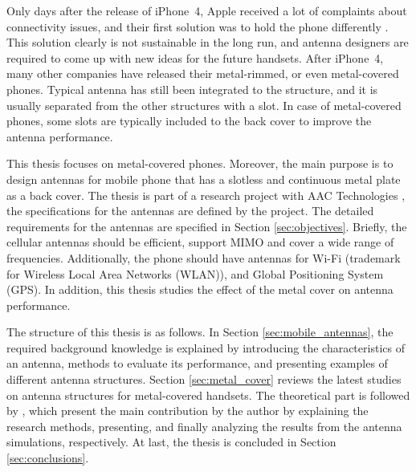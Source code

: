 Only days after the release of iPhone~4, Apple received a lot of complaints about connectivity issues, and their first solution was to hold the phone differently \cite{apple_press,apple_bbc}. This solution clearly is not sustainable in the long run, and antenna designers are required to come up with new ideas for the future handsets. After iPhone~4, many other companies have released their metal-rimmed, or even metal-covered phones. Typical antenna has still been integrated to the structure, and it is usually separated from the other structures with a slot. In case of metal-covered phones, some slots are typically included to the back cover to improve the antenna performance. 

This thesis focuses on metal-covered phones. Moreover, the main purpose is to design antennas for mobile phone that has a slotless and continuous metal plate as a back cover. The thesis is part of a research project with AAC Technologies \cite{aac}, the specifications for the antennas are defined by the project. The detailed requirements for the antennas are specified in Section \ref{sec:objectives}. Briefly, the cellular antennas should be efficient, support MIMO and cover a wide range of frequencies. Additionally, the phone should have antennas for Wi-Fi (trademark for Wireless Local Area Networks (WLAN)), and Global Positioning System (GPS). In addition, this thesis studies the effect of the metal cover on antenna performance.

The structure of this thesis is as follows. In Section \ref{sec:mobile_antennas}, the required background knowledge is explained by introducing the characteristics of an antenna, methods to evaluate its performance, and presenting examples of different antenna structures. Section \ref{sec:metal_cover} reviews the latest studies on antenna structures for metal-covered handsets. The theoretical part is followed by , which present the main contribution by the author by explaining the research methods, presenting, and finally analyzing the results from the antenna simulations, respectively. At last, the thesis is concluded in Section \ref{sec:conclusions}.

\clearpage
